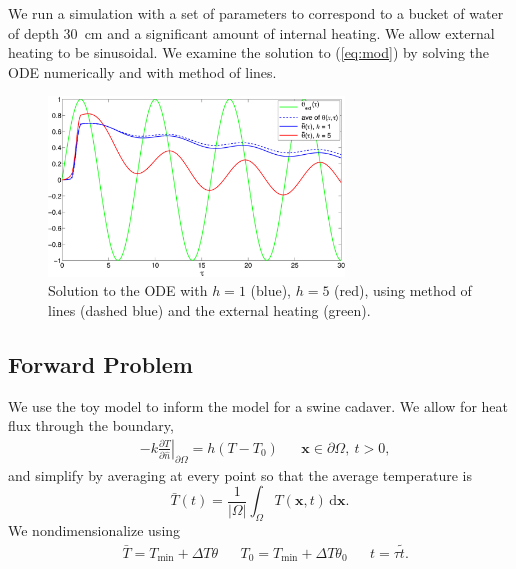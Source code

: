 \documentclass{beamer}
\newcommand{\pd}[2]{\frac{\partial #1}{\partial #2}}
\begin{document}
\begin{frame}
  We run a simulation with a set of parameters to
  correspond to a bucket of water of depth 30~\textsf{cm} and a
  significant amount of internal heating. We allow external heating to
  be sinusoidal. We examine the solution to
  (\ref{eq:mod}) by solving the ODE numerically and with method of
  lines.
  \begin{figure}
    \includegraphics[width=0.7\textwidth]{Figures/toymodelcomp}
    \caption{Solution to the ODE with $h=1$ (blue), $h=5$ (red), using
    method of lines (dashed blue) and the external heating (green).}
  \end{figure}

\end{frame}

\subsection{Forward Problem}

\begin{frame}
  We use the toy model to inform the model for a swine cadaver. We
  allow for heat flux through the boundary,
  \begin{align}
\label{eq:model_bc}
    &- k \left.\pd{T}{\hat{n}}\right|_{\partial \Omega} = h(T-T_0)& 
    &\mathbf{x} \in \partial \Omega,\ t>0,
  \end{align}
  and simplify by averaging at every point so that the average
  temperature is
  \begin{equation}
\label{eq:avg}
    \bar{T}(t) = \frac{1}{|\Omega|}\int_{\Omega} 
    T(\mathbf{x}, t)\,\mathrm{d} \mathbf{x}.
  \end{equation}
  We nondimensionalize using
  \begin{align}
    &\bar{T} = T_{\text{min}} + \Delta T \theta&
    &T_0 = T_{\text{min}} + \Delta T\theta_0&
    &t = \tau \tilde{t}.
\end{align}
\end{frame}
\end{document}
